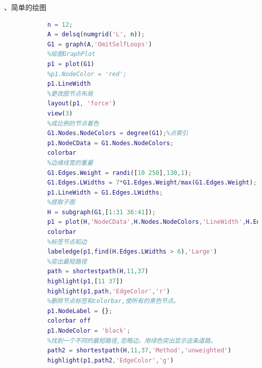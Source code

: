             、简单的绘图
            \begin{lstlisting}[language=Matlab]
            %创建graph
            n = 12;
            A = delsq(numgrid('L', n));
            G1 = graph(A,'OmitSelfLoops')
            %绘图GraphPlot
            p1 = plot(G1)
            %p1.NodeColor = 'red';
            p1.LineWidth
            %更改图节点布局
            layout(p1, 'force')
            view(3)
            %成比例的节点着色
            G1.Nodes.NodeColors = degree(G1);%点索引
            p1.NodeCData = G1.Nodes.NodeColors;
            colorbar
            %边缘线宽的重量
            G1.Edges.Weight = randi([10 250],130,1);
            G1.Edges.LWidths = 7*G1.Edges.Weight/max(G1.Edges.Weight);
            p1.LineWidth = G1.Edges.LWidths;
            %提取子图
            H = subgraph(G1,[1:31 36:41]);
            p1 = plot(H,'NodeCData',H.Nodes.NodeColors,'LineWidth',H.Edges.LWidths);
            colorbar
            %标签节点和边
            labeledge(p1,find(H.Edges.LWidths > 6),'Large')
            %突出最短路径
            path = shortestpath(H,11,37)
            highlight(p1,[11 37])
            highlight(p1,path,'EdgeColor','r')
            %删除节点标签和colorbar,使所有的黑色节点。
            p1.NodeLabel = {};
            colorbar off
            p1.NodeColor = 'black';
            %找到一个不同的最短路径,忽略边。用绿色突出显示这条道路。
            path2 = shortestpath(H,11,37,'Method','unweighted')
            highlight(p1,path2,'EdgeColor','g')
            \end{lstlisting}
